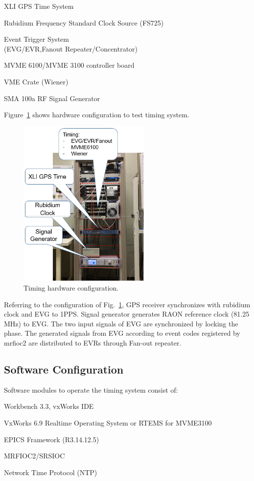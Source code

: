 \documentclass[a4paper,
              ]{jacow}
\begin{document}
\begin{Itemize}
	\item XLI GPS Time System
	\item Rubidium Frequency Standard Clock Source (FS725)
	\item Event Trigger System \\
	(EVG/EVR,Fanout Repeater/Concentrator)
	\item MVME 6100/MVME 3100 controller board 
	\item VME Crate (Wiener)
	\item SMA 100a RF Signal Generator
\end{Itemize}
\hfil\break
Figure~\ref{timing:rack} shows hardware configuration to test timing system. 
\begin{figure}[!htb]
	\centering
	\includegraphics*[width=65mm]{WEPGF124f1}
	\caption{Timing hardware configuration.}
	\label{timing:rack}
\end{figure}

Referring to the configuration of Fig.~\ref{timing:rack}, GPS receiver synchronizes with rubidium clock and EVG to 1PPS. Signal generator generates RAON reference clock (81.25 MHz) to EVG. The two input signals of EVG are synchronized by locking the phase. The generated signals from EVG according to event codes registered by mrfioc2 are distributed to EVRs through Fan-out repeater.

\subsection{Software Configuration}
Software modules to operate the timing system consist of:
\begin{Itemize}
	\item Workbench 3.3, vxWorks IDE
	\item VxWorks 6.9 Realtime Operating System or RTEMS for MVME3100
	\item EPICS Framework (R3.14.12.5)
	\item MRFIOC2/SRSIOC 
	\item Network Time Protocol (NTP)
\end{Itemize}
\end{document}
